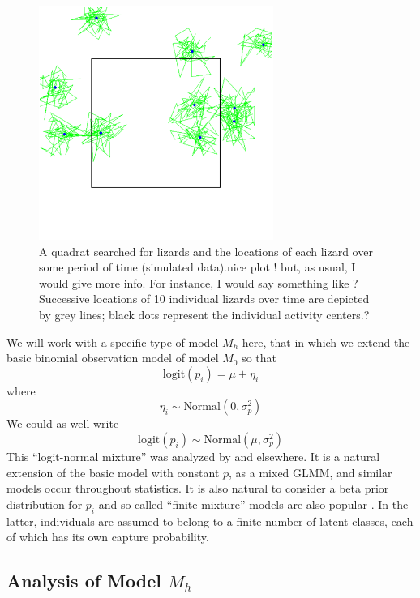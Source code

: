 \begin{figure}
\begin{center}
\includegraphics[height=3in]{Ch3/figs/quadrat}
\end{center}
\caption{A quadrat searched for lizards and the locations of each
  lizard over some period of time (simulated data).nice plot ! but, as usual, I would give more info. For instance, I would say something like ?Successive locations of 10 individual lizards over time are depicted by grey lines; black dots represent the individual activity centers.?}
\label{closed.fig.quadrat}
\end{figure}

We will work with a specific type of model $M_{h}$ here, that in which
we extend the basic binomial observation model of model $M_{0}$ so
that
\[
\mbox{logit}(p_{i}) = \mu + \eta_{i}
\]
where
\[
\eta_{i} \sim \mbox{Normal}(0, \sigma_{p}^2)
\]
We could as well write
\[
\mbox{logit}(p_{i}) \sim \mbox{Normal}(\mu,\sigma_{p}^2)
\]
This ``logit-normal mixture'' was analyzed by
\citet{coull_agresti:1999} and elsewhere. It is a natural extension of
the basic model with constant $p$, as a mixed GLMM, and similar models
occur throughout statistics. It is also natural to consider a beta
prior distribution for $p_{i}$ \citep{dorazio_royle:2003} and
so-called ``finite-mixture'' models are also popular
\citep{norris_pollock:1996, pledger:2000}. In the latter, individuals
are assumed to belong to a finite number of latent classes, each of
which has its own capture probability.


\subsection{Analysis of Model $M_h$}

